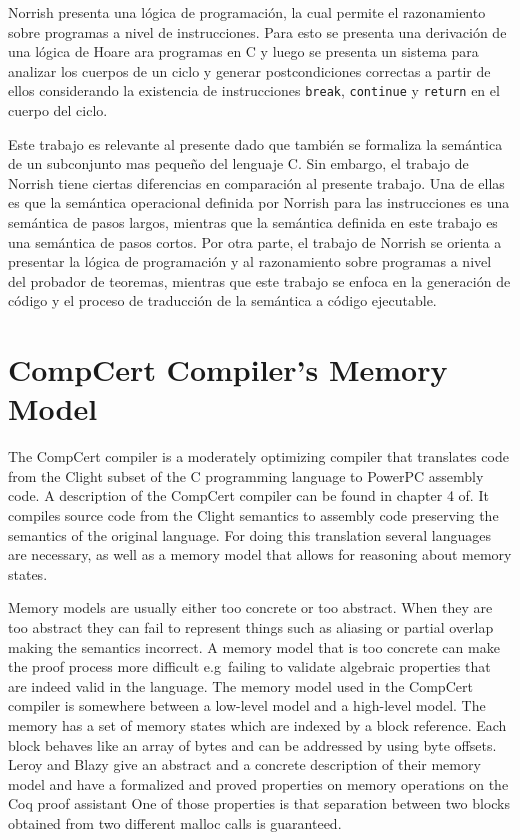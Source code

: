 Norrish presenta una lógica de programación, la cual permite el razonamiento sobre programas a nivel de instrucciones.
Para esto se presenta una derivación de una lógica de Hoare ara programas en C y luego se presenta un sistema para analizar los cuerpos de un ciclo y generar postcondiciones correctas a partir de ellos considerando la existencia de instrucciones \verb|break|, \verb|continue| y \verb|return| en el cuerpo del ciclo.

Este trabajo es relevante al presente dado que también se formaliza la semántica de un subconjunto mas pequeño del lenguaje C.
Sin embargo, el trabajo de Norrish tiene ciertas diferencias en comparación al presente trabajo.
Una de ellas es que la semántica operacional definida por Norrish para las instrucciones es una semántica de pasos largos, mientras que la semántica definida en este trabajo es una semántica de pasos cortos.
Por otra parte, el trabajo de Norrish se orienta a presentar la lógica de programación y al razonamiento sobre programas a nivel del probador de teoremas, mientras que este trabajo se enfoca en la generación de código y el proceso de traducción de la semántica a código ejecutable.

\section{CompCert Compiler's Memory Model}

The CompCert compiler is a moderately optimizing compiler that translates code from the Clight subset of the C programming language\cite{clight} to PowerPC assembly code.
A description of the CompCert compiler can be found in chapter 4 of\cite{compcert-float-point}.
It compiles source code from the Clight semantics to assembly code preserving the semantics of the original language.
For doing this translation several languages are necessary, as well as a memory model that allows for reasoning about memory states.

Memory models are usually either too concrete or too abstract.
When they are too abstract they can fail to represent things such as aliasing or partial overlap making the semantics incorrect.
A memory model that is too concrete can make the proof process more difficult e.g\ failing to validate algebraic properties that are indeed valid in the language.
The memory model used in the CompCert compiler\cite{leroy-blazy-memory-model} is somewhere between a low-level model and a high-level model.
The memory has a set of memory states which are indexed by a block reference.
Each block behaves like an array of bytes and can be addressed by using byte offsets.
Leroy and Blazy give an abstract and a concrete description of their memory model and have a formalized and proved properties on memory operations on the Coq proof assistant\cite{coq-doc}
One of those properties is that separation between two blocks obtained from two different malloc calls is guaranteed.

